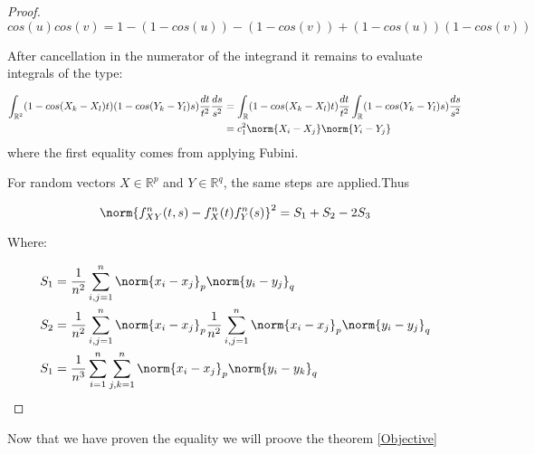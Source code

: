 \begin{proof}
$$
cos(u)cos(v) = 1-(1-cos(u))-(1-cos(v))+(1-cos(u))(1-cos(v))
$$

After cancellation in the numerator of the integrand it remains to evaluate integrals of the type:

\begin{equation}{}
\begin{split}
\int_{\mathbb{R}^{2}}(1-cos(X_{k}-X_{l})t)(1-cos(Y_{k}-Y_{l})s)\frac{dt}{t^{2}}\frac{ds}{s^{2}} &
= \int_{\mathbb{R}}(1-cos(X_{k}-X_{l})t)\frac{dt}{t^{2}}\int_{\mathbb{R}}(1-cos(Y_{k}-Y_{l})s)\frac{ds}{s^{2}} \\
&= c_{1}^{2}\norm{X_{i}-X_{j}}\norm{Y_{i}-Y_{j}}
\end{split}
\end{equation}
where the first equality comes from applying Fubini.

For random vectors $X\in\mathbb{R}^{p}$ and $Y\in\mathbb{R}^{q}$, the same steps are applied.Thus

$$
\norm{f_{XY}^{n}(t,s) - f_{X}^{n}(t)f_{Y}^{n}(s)}^{2} = S_{1} +S_{2}-2S_{3}
$$

Where:

\begin{equation}{}
\begin{split}
& S_{1} =\frac{1}{n^{2}} \sum_{i,j=1}^{n}\norm{x_{i}-x_{j}}_{p}\norm{y_{i}-y_{j}}_{q} \\
& S_{2} =\frac{1}{n^{2}} \sum_{i,j=1}^{n}\norm{x_{i}-x_{j}}_{p}\frac{1}{n^{2}} \sum_{i,j=1}^{n}\norm{x_{i}-x_{j}}_{p}\norm{y_{i}-y_{j}}_{q} \\
&S_{1} =\frac{1}{n^{3}} \sum_{i=1}^{n}\sum_{j,k=1}^{n}\norm{x_{i}-x_{j}}_{p}\norm{y_{i}-y_{k}}_{q}
\end{split}
\end{equation}
\end{proof}
Now that we have proven the equality we will proove the theorem \ref{Objective}
